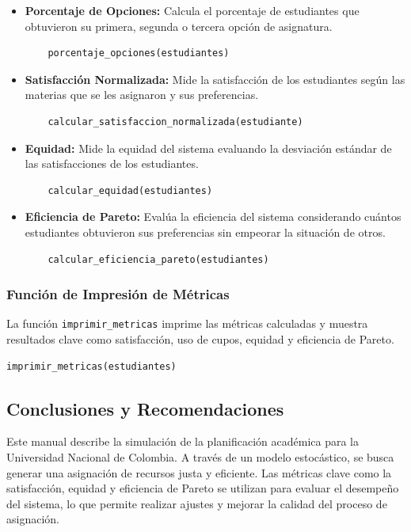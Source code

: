\documentclass{article}
\begin{document}
\begin{itemize}
    \item \textbf{Porcentaje de Opciones:} Calcula el porcentaje de estudiantes que obtuvieron 
          su primera, segunda o tercera opción de asignatura.
    \begin{verbatim}
    porcentaje_opciones(estudiantes)
    \end{verbatim}

    \item \textbf{Satisfacción Normalizada:} Mide la satisfacción de los estudiantes 
          según las materias que se les asignaron y sus preferencias.
    \begin{verbatim}
    calcular_satisfaccion_normalizada(estudiante)
    \end{verbatim}

    \item \textbf{Equidad:} Mide la equidad del sistema evaluando la desviación estándar 
          de las satisfacciones de los estudiantes.
    \begin{verbatim}
    calcular_equidad(estudiantes)
    \end{verbatim}

    \item \textbf{Eficiencia de Pareto:} Evalúa la eficiencia del sistema considerando 
          cuántos estudiantes obtuvieron sus preferencias sin empeorar la situación de otros.
    \begin{verbatim}
    calcular_eficiencia_pareto(estudiantes)
    \end{verbatim}
\end{itemize}

\subsubsection{Función de Impresión de Métricas}
La función \texttt{imprimir\_metricas} imprime las métricas calculadas y muestra resultados 
clave como satisfacción, uso de cupos, equidad y eficiencia de Pareto.

\begin{verbatim}
imprimir_metricas(estudiantes)
\end{verbatim}

\subsection{Conclusiones y Recomendaciones}
Este manual describe la simulación de la planificación académica para la Universidad Nacional 
de Colombia. A través de un modelo estocástico, se busca generar una asignación de recursos justa 
y eficiente. Las métricas clave como la satisfacción, equidad y eficiencia de Pareto se utilizan 
para evaluar el desempeño del sistema, lo que permite realizar ajustes y mejorar la calidad del 
proceso de asignación.
\end{document}

